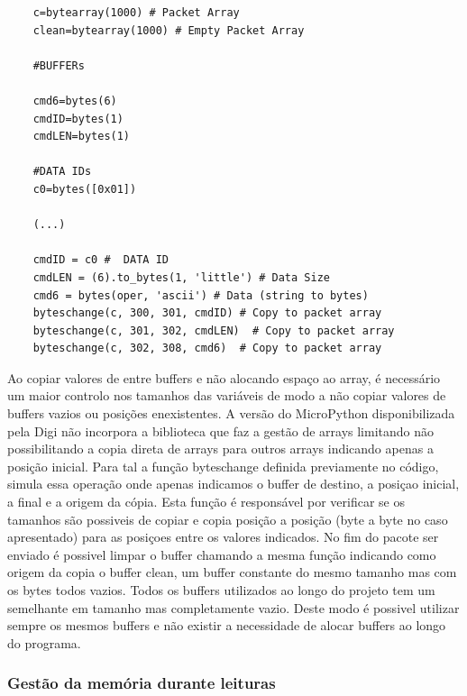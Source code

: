 	
\begin{verbatim}
	c=bytearray(1000) # Packet Array
	clean=bytearray(1000) # Empty Packet Array 

	#BUFFERs

	cmd6=bytes(6)
	cmdID=bytes(1)
	cmdLEN=bytes(1)

	#DATA IDs
	c0=bytes([0x01])
	
	(...)	

	cmdID = c0 #  DATA ID
	cmdLEN = (6).to_bytes(1, 'little') # Data Size
	cmd6 = bytes(oper, 'ascii') # Data (string to bytes)
	byteschange(c, 300, 301, cmdID) # Copy to packet array 
	byteschange(c, 301, 302, cmdLEN)  # Copy to packet array 
	byteschange(c, 302, 308, cmd6)  # Copy to packet array 
 \end{verbatim}

\par Ao copiar valores de entre buffers e não alocando espaço ao array, é necessário um maior controlo nos tamanhos das variáveis de modo a não copiar valores de buffers vazios ou posições enexistentes. A versão do MicroPython disponibilizada pela Digi não incorpora a biblioteca que faz a gestão de arrays limitando não possibilitando a copia direta de arrays para outros arrays indicando apenas a posição inicial. Para tal a função byteschange definida previamente no código, simula essa operação onde apenas indicamos o buffer de destino, a posiçao inicial, a final e a origem da cópia. Esta função é responsável por verificar se os tamanhos são possiveis de copiar e copia posição a posição (byte a byte no caso apresentado) para as posiçoes entre os valores indicados. No fim do pacote ser enviado é possivel limpar o buffer chamando a mesma função indicando como origem da copia o buffer clean, um buffer constante do mesmo tamanho mas com os bytes todos vazios. Todos os buffers utilizados ao longo do projeto tem um semelhante em tamanho mas completamente vazio. Deste modo é possivel utilizar sempre os mesmos buffers e não existir a necessidade de alocar buffers ao longo do programa.

\subsubsection {Gestão da memória durante leituras}

